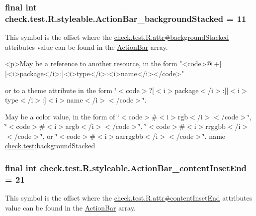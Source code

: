 \subsubsection[{Action\+Bar\+\_\+background\+Stacked}]{\setlength{\rightskip}{0pt plus 5cm}final int check.\+test.\+R.\+styleable.\+Action\+Bar\+\_\+background\+Stacked = 11\hspace{0.3cm}{\ttfamily [static]}}\label{classcheck_1_1test_1_1_r_1_1styleable_a6cf5689cb912280e627b781eaa714029}
This symbol is the offset where the \hyperlink{classcheck_1_1test_1_1_r_1_1attr_a003c234c1dbf40a537758be65695c08b}{check.\+test.\+R.\+attr\#background\+Stacked} attribute\textquotesingle{}s value can be found in the \hyperlink{classcheck_1_1test_1_1_r_1_1styleable_ad0a4d403cb244ea4d22c6f6ebf2c2cdf}{Action\+Bar} array.

\begin{DoxyVerb}      <p>May be a reference to another resource, in the form "<code>@[+][<i>package</i>:]<i>type</i>:<i>name</i></code>"
\end{DoxyVerb}
 or to a theme attribute in the form \char`\"{}$<$code$>$?\mbox{[}$<$i$>$package$<$/i$>$\+:\mbox{]}\mbox{[}$<$i$>$type$<$/i$>$\+:\mbox{]}$<$i$>$name$<$/i$>$$<$/code$>$\char`\"{}. 

May be a color value, in the form of \char`\"{}$<$code$>$\#$<$i$>$rgb$<$/i$>$$<$/code$>$\char`\"{}, \char`\"{}$<$code$>$\#$<$i$>$argb$<$/i$>$$<$/code$>$\char`\"{}, \char`\"{}$<$code$>$\#$<$i$>$rrggbb$<$/i$>$$<$/code$>$\char`\"{}, or \char`\"{}$<$code$>$\#$<$i$>$aarrggbb$<$/i$>$$<$/code$>$\char`\"{}.  name \hyperlink{namespacecheck_1_1test}{check.\+test}\+:background\+Stacked \hypertarget{classcheck_1_1test_1_1_r_1_1styleable_a63267bbb6779348e53e468800d19e766}{}
\subsubsection[{Action\+Bar\+\_\+content\+Inset\+End}]{\setlength{\rightskip}{0pt plus 5cm}final int check.\+test.\+R.\+styleable.\+Action\+Bar\+\_\+content\+Inset\+End = 21\hspace{0.3cm}{\ttfamily [static]}}\label{classcheck_1_1test_1_1_r_1_1styleable_a63267bbb6779348e53e468800d19e766}
This symbol is the offset where the \hyperlink{classcheck_1_1test_1_1_r_1_1attr_ae54701e7140ba2c59574741d9e6cde46}{check.\+test.\+R.\+attr\#content\+Inset\+End} attribute\textquotesingle{}s value can be found in the \hyperlink{classcheck_1_1test_1_1_r_1_1styleable_ad0a4d403cb244ea4d22c6f6ebf2c2cdf}{Action\+Bar} array.

